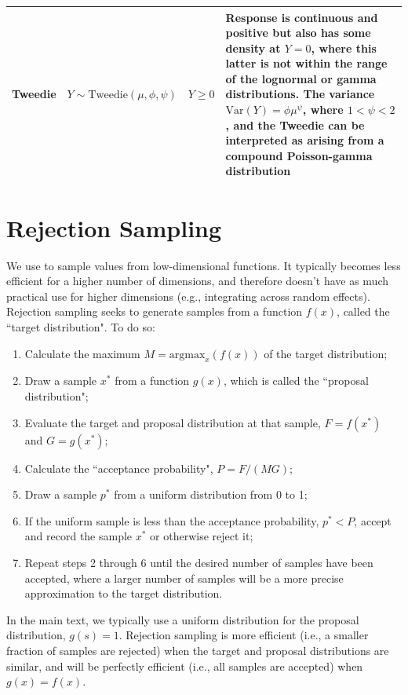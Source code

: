 \begin{table}
\begin{center}
\begin{tabularx}{\textwidth}{ | X m{1.5in} X m{2in} | }
  Tweedie & \( Y \sim \mathrm{Tweedie}( \mu, \phi, \psi ) \)  & \( Y \geq 0 \) & Response is continuous and positive but also has some density at \(Y=0\), where this latter is not within the range of the lognormal or gamma distributions. The variance \(\mathrm{Var}(Y) = \phi \mu^{\psi}\), where \( 1 < \psi < 2 \), and the Tweedie can be interpreted as arising from a compound Poisson-gamma distribution \\ 
  \hline

\end{tabularx}
  \label{tab:Appendix_distributions}
\end{center}
\end{table}

\section{Rejection Sampling} \label{sec:rejection_sampling}

We use  to sample values from low-dimensional functions.  It typically becomes less efficient for a higher number of dimensions, and therefore doesn't have as much practical use for higher dimensions (e.g., integrating across random effects).  Rejection sampling seeks to generate samples from a function \(f(x)\), called the ``target distribution".  To do so:
\begin{enumerate}
  \item Calculate the maximum \(M=\mathrm{argmax}_x(f(x))\) of the target distribution;

  \item Draw a sample \(x^*\) from a function \(g(x)\), which is called the ``proposal distribution";

  \item Evaluate the target and proposal distribution at that sample, \(F=f(x^*)\) and \(G=g(x^*)\);

  \item Calculate the ``acceptance probability", \(P=F/(MG)\);

  \item Draw a sample \(p^*\) from a uniform distribution from 0 to 1;

  \item If the uniform sample is less than the acceptance probability, \(p^*<P\), accept and record the sample \(x^*\) or otherwise reject it;

  \item Repeat steps 2 through 6 until the desired number of samples have been accepted, where a larger number of samples will be a more precise approximation to the target distribution.
\end{enumerate}
In the main text, we typically use a uniform distribution for the proposal distribution, \(g(s)=1\).  Rejection sampling is more efficient (i.e., a smaller fraction of samples are rejected) when the target and proposal distributions are similar, and will be perfectly efficient (i.e., all samples are accepted) when \(g(x)=f(x)\).

